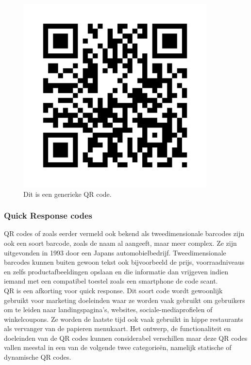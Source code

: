\begin{figure}
    \includegraphics[width=10cm, height=10cm]{QRCode.png}
    \caption[QR Code]{Dit is een generieke QR code.}
    \label{fig:qr}
\end{figure}

\subsubsection{Quick Response codes}
QR codes of zoals eerder vermeld ook bekend als tweedimensionale barcodes zijn ook een soort barcode, zoals de naam al aangeeft, maar meer complex. Ze zijn uitgevonden in 1993 door een Japans automobielbedrijf. Tweedimensionale barcodes kunnen buiten gewoon tekst ook bijvoorbeeld de prijs, voorraadniveaus en zelfs productafbeeldingen opslaan en die informatie dan vrijgeven indien iemand met een compatibel toestel zoals een smartphone de code scant.\\

QR is een afkorting voor quick response. Dit soort code wordt gewoonlijk gebruikt voor marketing doeleinden \autocite{Rodrigue2022} waar ze worden vaak gebruikt om gebruikers om te leiden naar landingspagina's, websites, sociale-mediaprofielen of winkelcoupons. Ze worden de laatste tijd ook vaak gebruikt in hippe restaurants als vervanger van de papieren menukaart. Het ontwerp, de functionaliteit en doeleinden van de QR codes kunnen considerabel verschillen maar deze QR codes vallen meestal in een van de volgende twee categorieën, namelijk statische of dynamische QR codes. \\

